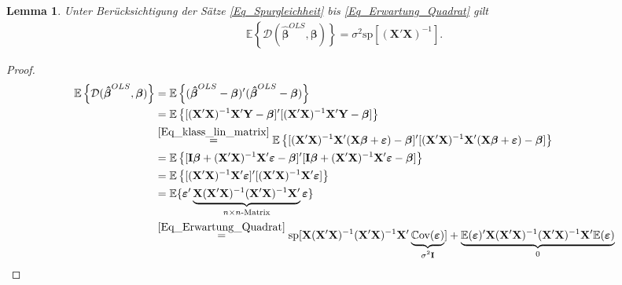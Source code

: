 \documentclass[12pt, a4paper]{report}\usepackage[]{graphicx}\usepackage[]{color}
\newtheorem{lemma}{Lemma}
\begin{document}
\begin{appendix}
\begin{lemma}
Unter Berücksichtigung der Sätze \eqref{Eq_Spurgleichheit} bis \eqref{Eq_Erwartung_Quadrat} gilt
\begin{align*}
\mathbb{E} \left\lbrace \mathcal{D}(\boldsymbol{\hat{\beta}}^{OLS},\boldsymbol{\beta}) \right\rbrace = \sigma^2 \text{sp}[(\mathbf{X}'\mathbf{X})^{-1}].
\end{align*}
\end{lemma}
\begin{proof}
\begin{align}\label{Eq_Beweis_Erwarteter_Quadrierter_Abstand}
\mathbb{E} \left\lbrace \mathcal{D}(\boldsymbol{\hat{\beta}}^{OLS},\boldsymbol{\beta}) \right\rbrace
&=\mathbb{E} \left\lbrace (\boldsymbol{\hat{\beta}}^{OLS} - \boldsymbol{\beta} )'(\boldsymbol{\hat{\beta}}^{OLS}-\boldsymbol{\beta}) \right\rbrace \notag \\
&=\mathbb{E}\left\lbrace [(\mathbf{X}'\mathbf{X})^{-1}\mathbf{X}'\mathbf{Y} - \boldsymbol{\beta}]' [(\mathbf{X}'\mathbf{X})^{-1}\mathbf{X}'\mathbf{Y} - \boldsymbol{\beta}] \right\rbrace \notag \\
&\stackrel{\eqref{Eq_klass_lin_matrix}}{=}\mathbb{E}\left\lbrace [(\mathbf{X}'\mathbf{X})^{-1}\mathbf{X}'(\mathbf{X}\boldsymbol{\beta} +\boldsymbol{\varepsilon} ) -\boldsymbol{\beta}]' [(\mathbf{X}'\mathbf{X})^{-1}\mathbf{X}'(\mathbf{X}\boldsymbol{\beta} +\boldsymbol{\varepsilon} ) -\boldsymbol{\beta}] \right\rbrace \notag \\
&=\mathbb{E}\left\lbrace [\mathbf{I}\boldsymbol{\beta} + (\mathbf{X}'\mathbf{X})^{-1}\mathbf{X}'\boldsymbol{\varepsilon} - \boldsymbol{\beta}]'[\mathbf{I}\boldsymbol{\beta} + (\mathbf{X}'\mathbf{X})^{-1}\mathbf{X}'\boldsymbol{\varepsilon} - \boldsymbol{\beta}]
\right\rbrace \notag \\
&=\mathbb{E}\left\lbrace [(\mathbf{X}'\mathbf{X})^{-1}\mathbf{X}'\boldsymbol{\varepsilon}]'[(\mathbf{X}'\mathbf{X})^{-1}\mathbf{X}'\boldsymbol{\varepsilon}] 
\right\rbrace \notag \\
&=\mathbb{E}\{
\boldsymbol{\varepsilon}'\underbrace{\mathbf{X}(\mathbf{X}'\mathbf{X})^{-1}(\mathbf{X}'\mathbf{X})^{-1}\mathbf{X}'}_{\substack{n \times n \text{-Matrix}}}\boldsymbol{\varepsilon}
\} \notag \\
&\stackrel{\eqref{Eq_Erwartung_Quadrat}}{=}\text{sp}[\mathbf{X}(\mathbf{X}'\mathbf{X})^{-1}(\mathbf{X}'\mathbf{X})^{-1}\mathbf{X}'\underbrace{\mathbb{C}\text{ov}(\boldsymbol{\varepsilon})}_{\substack{\sigma^2\mathbf{I}}}] + \underbrace{\mathbb{E}(\boldsymbol{\varepsilon})'\mathbf{X}(\mathbf{X}'\mathbf{X})^{-1}(\mathbf{X}'\mathbf{X})^{-1}\mathbf{X}'\mathbb{E}(\boldsymbol{\varepsilon})}_{\substack{0}} \notag \\

\end{align}
\end{proof}
\end{appendix}
\end{document}

